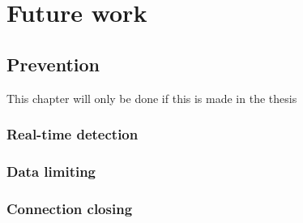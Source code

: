 
\chapter{Future work} %

\label{prevention} %

\section{Prevention}
This chapter will only be done if this is made in the thesis
\subsection{Real-time detection}

\subsection{Data limiting}

\subsection{Connection closing}

